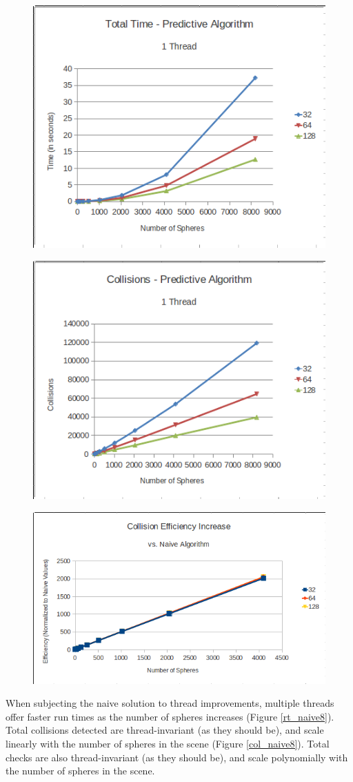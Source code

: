 \documentclass[CEJCS,PDF]{cej} %
\begin{document}
\begin{center}
\begin{figure}
	\includegraphics[width=.45\textwidth]{runtime_predictive_1thread.png}
	\label{rt_predict1}
\end{figure}
\end{center}

\begin{center}
\begin{figure}
	\includegraphics[width=.45\textwidth]{collisions_predictive_1thread.png}
	\label{col_predict1}
\end{figure}
\end{center}

\begin{center}
\begin{figure}
	\includegraphics[width=.45\textwidth]{collision_efficiency.png}
	\label{col_eff}
\end{figure}
\end{center}

When subjecting the naive solution to thread improvements, multiple threads offer faster run times as the number of spheres increases (Figure \ref{rt_naive8}).  Total collisions detected are thread-invariant (as they should be), and scale linearly with the number of spheres in the scene (Figure \ref{col_naive8}).  Total checks are also thread-invariant (as they should be), and scale polynomially with the number of spheres in the scene.
\end{document}
